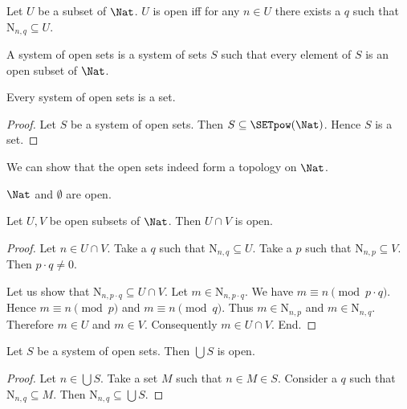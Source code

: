 \documentclass{article}
\newcommand{\N}{\mathrm{N}}
\begin{document}
  \begin{forthel}
    \begin{definition}
      Let $U$ be a subset of $\Nat$.
      $U$ is open iff for any $n \in U$ there exists a $q$ such that
      $\N_{n, q} \subseteq U$.
    \end{definition}

    \begin{definition}
      A system of open sets is a system of sets $S$ such that every element of
      $S$ is an open subset of $\Nat$.
    \end{definition}

    \begin{lemma}
      Every system of open sets is a set.
    \end{lemma}
    \begin{proof}
      Let $S$ be a system of open sets.
      Then $S \subseteq \SETpow(\Nat)$.
      Hence $S$ is a set.
    \end{proof}
  \end{forthel}

  We can show that the open sets indeed form a topology on $\Nat$.

  \begin{forthel}
    \begin{lemma}
      $\Nat$ and $\emptyset$ are open.
    \end{lemma}

    \begin{lemma}
      Let $U,V$ be open subsets of $\Nat$.
      Then $U \cap V$ is open.
    \end{lemma}
    \begin{proof}
      Let $n \in U \cap V$.
      Take a $q$ such that $\N_{n, q} \subseteq U$.
      Take a $p$ such that $\N_{n, p} \subseteq V$.
      Then $p \cdot q \neq 0$.

      Let us show that $\N_{n, p \cdot q} \subseteq U \cap V$.
        Let $m \in \N_{n, p \cdot q}$.
        We have $m \equiv n \pmod{p \cdot q}$.
        Hence $m \equiv n \pmod{p}$ and $m \equiv n \pmod{q}$.
        Thus $m \in \N_{n, p}$ and $m \in \N_{n, q}$.
        Therefore $m \in U$ and $m \in V$.
        Consequently $m \in U \cap V$.
      End.
    \end{proof}

    \begin{lemma}
      Let $S$ be a system of open sets.
      Then $\bigcup S$ is open.
    \end{lemma}
    \begin{proof}
      Let $n \in \bigcup S$.
      Take a set $M$ such that $n \in M \in S$.
      Consider a $q$ such that $\N_{n, q} \subseteq M$.
      Then $\N_{n, q} \subseteq \bigcup S$.
    \end{proof}
  \end{forthel}
\end{document}
